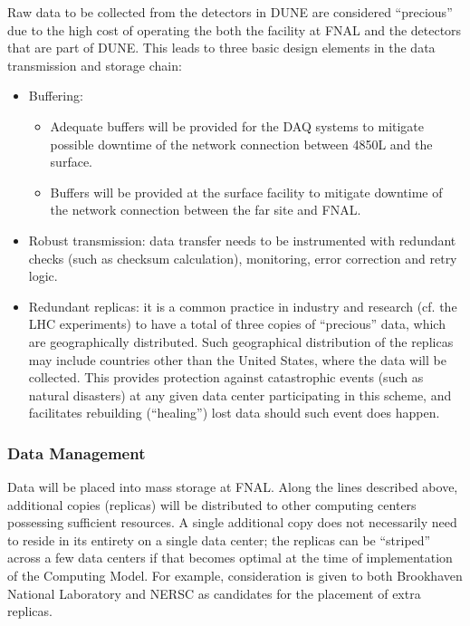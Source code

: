 Raw data to be collected from the detectors in DUNE are considered
``precious'' due to the high cost of operating the both the facility at
FNAL and the detectors that are part of DUNE. This leads to three
basic design elements in the data transmission and storage chain:
\begin{itemize}
\item Buffering:
\begin{itemize}
\item Adequate buffers will be provided for the DAQ systems to
  mitigate possible downtime of the network connection between 4850L
  and the surface.
\item Buffers will be provided at the surface facility to mitigate
  downtime of the network connection between the far site and FNAL.
\end{itemize}
\item Robust transmission: data transfer needs to be instrumented with
  redundant checks (such as checksum calculation), monitoring, error
  correction and retry logic.
\item Redundant replicas: it is a common practice in industry and
  research (cf. the LHC experiments) to have a total of three copies
  of ``precious'' data, which are geographically distributed.  Such
  geographical distribution of the replicas may include countries
  other than the United States, where the data will be collected.
  This provides protection against catastrophic events (such as
  natural disasters) at any given data center participating in this
  scheme, and facilitates rebuilding (``healing'') lost data should
  such event does happen.
\end{itemize}


\subsubsection{Data Management}
\label{sec:detectors-sc-infrastructure-computing-model-data-mgt}

Data will be placed into mass storage at FNAL. Along the lines
described above, additional copies (replicas) will be distributed to
other computing centers possessing sufficient resources.  A single
additional copy does not necessarily need to reside in its entirety on
a single data center; the replicas can be ``striped'' across a few
data centers if that becomes optimal at the time of implementation of
the Computing Model. For example, consideration is given to both
Brookhaven National Laboratory and NERSC as candidates for the
placement of extra replicas.

